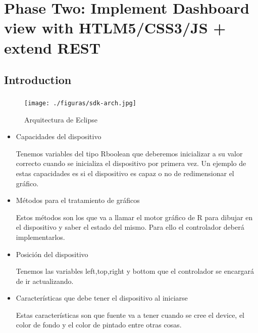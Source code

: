 \part{Phase Two: Implement Dashboard view with HTLM5/CSS3/JS + extend REST}
\chapter{Introduction}
\label{c_phasetwo}

\section{}

\subsection{}

\subsubsection{}

\begin{figure}[ht!]
	\centering
   	\texttt{[image: ./figuras/sdk-arch.jpg]}
   	\caption{Arquitectura de Eclipse}
   	\label{f_Arquitectura_Eclipse}
\end{figure}

\begin{itemize}
  
  \item Capacidades del dispositivo
  
  Tenemos variables del tipo \textsf{Rboolean} que deberemos inicializar a su valor
  correcto cuando se inicializa el dispositivo por primera vez. Un ejemplo de
  estas capacidades es si el dispositivo es capaz o no de redimensionar el
  gráfico.
  
  \item Métodos para el tratamiento de gráficos
  
  Estos métodos son los que va a llamar el motor gráfico de R para dibujar en el
  dispositivo y saber el estado del mismo. Para ello el controlador deberá
  implementarlos.
  
  \item Posición del dispositivo
  
  Tenemos las variables left,top,right y bottom que el controlador se encargará
  de ir actualizando.
  
  \item Características que debe tener el dispositivo al iniciarse
  
  Estas características son que fuente va a tener cuando se cree el device, el
  color de fondo y el color de pintado entre otras cosas.
  
\end{itemize}
